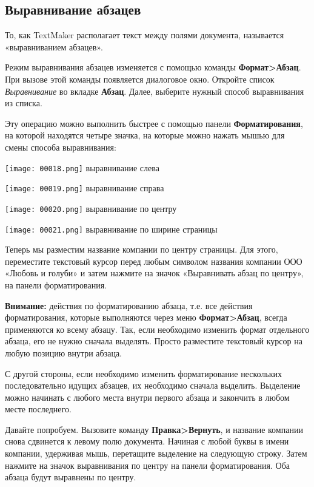 \documentclass[a4paper,10pt]{article}
\begin{document}
\subsection{Выравнивание абзацев}
То, как TextMaker располагает текст между полями документа, называется «выравниванием абзацев».

Режим выравнивания абзацев изменяется с помощью команды \textbf{Формат>Абзац}. При вызове этой команды появляется диалоговое окно. Откройте список \textit{Выравнивание} во вкладке \textbf{Абзац}. Далее, выберите нужный способ выравнивания из списка.

Эту операцию можно выполнить быстрее с помощью панели \textbf{Форматирования}, на которой находятся четыре значка, на которые можно нажать мышью для смены способа выравнивания:

\texttt{[image: 00018.png]} выравнивание слева

\texttt{[image: 00019.png]} выравнивание справа

\texttt{[image: 00020.png]} выравнивание по центру

\texttt{[image: 00021.png]} выравнивание по ширине страницы

Теперь мы разместим название компании по центру страницы. Для этого, переместите текстовый курсор перед любым символом названия компании ООО «Любовь и голуби» и затем нажмите на значок «Выравнивать абзац по центру», на панели форматирования.

\begin{mdframed}[backgroundcolor=blue!10]
\textbf{Внимание:} действия по форматированию абзаца, т.е. все действия форматирования, которые выполняются через меню \textbf{Формат>Абзац}, всегда применяются ко всему абзацу. Так, если необходимо изменить формат отдельного абзаца, его не нужно сначала выделять. Просто разместите текстовый курсор на любую позицию внутри абзаца.
\end{mdframed}

С другой стороны, если необходимо изменить форматирование нескольких последовательно идущих абзацев, их необходимо сначала выделить. Выделение можно начинать с любого места внутри первого абзаца и закончить в любом месте последнего.

Давайте попробуем. Вызовите команду \textbf{Правка>Вернуть}, и название компании снова сдвинется к левому полю документа. Начиная с любой буквы в имени компании, удерживая мышь, перетащите выделение на следующую строку. Затем нажмите на значок выравнивания по центру на панели форматирования. Оба абзаца будут выравнены по центру.
\end{document}
